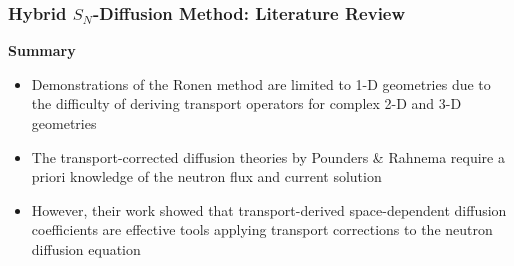 \begin{frame}
  \frametitle{Hybrid $S_N$-Diffusion Method: Literature Review}
  \begin{block}{\textbf{Summary}}
    \begin{itemize}
      \item Demonstrations of the Ronen method are limited to 1-D geometries due to the difficulty of
        deriving transport operators for complex 2-D and 3-D geometries
      \item The transport-corrected diffusion theories by Pounders \& Rahnema require a priori
        knowledge of the neutron flux and current solution
      \item However, their work showed that transport-derived space-dependent diffusion
        coefficients are effective tools applying transport corrections to the neutron diffusion
        equation
    \end{itemize}
  \end{block}
\end{frame}
